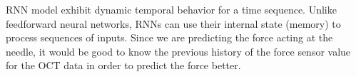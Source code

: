 

      RNN model exhibit dynamic temporal behavior for a time sequence. Unlike feedforward neural networks, RNNs can use their internal state (memory) to process sequences of inputs. Since we are predicting the force acting at the needle, it would be good to know the previous history of the force sensor value for the OCT data in order to predict the force better. 
